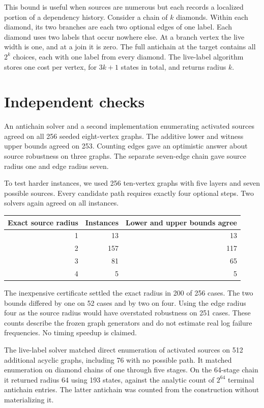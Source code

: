 \documentclass[11pt]{article}
\begin{document}
This bound is useful when sources are numerous but each records
a localized portion of a dependency history. Consider a chain of
$k$ diamonds. Within each diamond, its two branches are each
two optional edges of one label. Each diamond uses two labels
that occur nowhere else. At a branch vertex the live width is
one, and at a join it is zero. The full antichain at the target
contains all $2^k$ choices, each with one label from every
diamond. The live-label algorithm stores one cost per vertex,
for $3k+1$ states in total, and returns radius $k$.

\section{Independent checks}
An antichain solver and a second implementation enumerating
activated sources agreed on all 256 seeded eight-vertex graphs.
The additive lower and witness upper bounds agreed on 253.
Counting edges gave an optimistic answer about source robustness
on three graphs. The separate seven-edge chain gave source radius
one and edge radius seven.

To test harder instances, we used 256 ten-vertex graphs with
five layers and seven possible sources. Every candidate path
requires exactly four optional steps. Two solvers again agreed
on all instances.
\begin{center}
\begin{tabular}{rrr}
\toprule
Exact source radius & Instances & Lower and upper bounds agree \\
\midrule
1 & 13 & 13 \\
2 & 157 & 117 \\
3 & 81 & 65 \\
4 & 5 & 5 \\
\bottomrule
\end{tabular}
\end{center}
The inexpensive certificate settled the exact radius in 200 of
256 cases. The two bounds differed by one on 52 cases and by
two on four. Using the edge radius four as the source radius
would have overstated robustness on 251 cases. These counts
describe the frozen graph generators and do not estimate real
log failure frequencies. No timing speedup is claimed.

The live-label solver matched direct enumeration of activated
sources on 512 additional acyclic graphs, including 76 with
no possible path. It matched enumeration on diamond chains
of one through five stages. On the 64-stage chain it returned
radius 64 using 193 states, against the analytic count of
$2^{64}$ terminal antichain entries. The latter antichain was
counted from the construction without materializing it.
\end{document}
